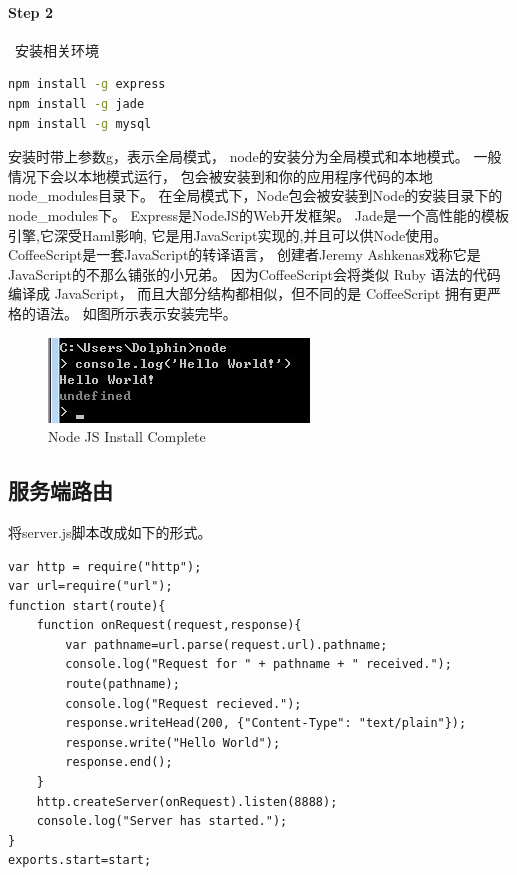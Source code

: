\documentclass{book}
\begin{document}
\paragraph{Step 2}~安装相关环境

\begin{lstlisting}[language=Bash]
npm install -g express  
npm install -g jade
npm install -g mysql
\end{lstlisting}

安装时带上参数g，表示全局模式，
node的安装分为全局模式和本地模式。
一般情况下会以本地模式运行，
包会被安装到和你的应用程序代码的本地node\_modules目录下。
在全局模式下，Node包会被安装到Node的安装目录下的node\_modules下。
Express是NodeJS的Web开发框架。
Jade是一个高性能的模板引擎,它深受Haml影响,
它是用JavaScript实现的,并且可以供Node使用。
CoffeeScript是一套JavaScript的转译语言，
创建者Jeremy Ashkenas戏称它是JavaScript的不那么铺张的小兄弟。
因为CoffeeScript会将类似 Ruby 语法的代码编译成 JavaScript，
而且大部分结构都相似，但不同的是 CoffeeScript 拥有更严格的语法。
如图所示表示安装完毕。

\begin{figure}[htbp]
	\centering
	\includegraphics[scale=1]{NodeJSInstallCompelete.jpg}
	\caption{Node JS Install Complete}
	\label{fig:NodeJSInstallCompelete}
\end{figure}


\subsection{服务端路由}

将server.js脚本改成如下的形式。

\begin{lstlisting}[language=VBScript]
var http = require("http");
var url=require("url");
function start(route){
	function onRequest(request,response){
		var pathname=url.parse(request.url).pathname;		
		console.log("Request for " + pathname + " received.");		
		route(pathname);		
		console.log("Request recieved.");
		response.writeHead(200, {"Content-Type": "text/plain"});
		response.write("Hello World");
		response.end();
	}	
	http.createServer(onRequest).listen(8888);
	console.log("Server has started.");
}
exports.start=start;
\end{lstlisting}
\end{document}
